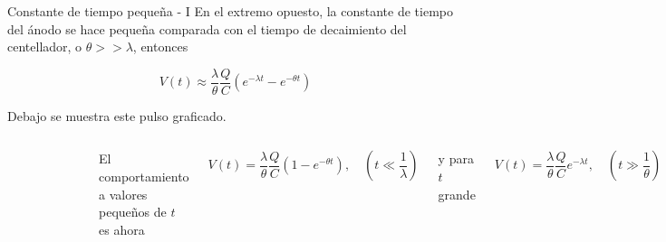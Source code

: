 \documentclass[a4paper,10pt]{beamer}
\begin{document}
\begin{frame}{Constante de tiempo pequeña - I}
En el extremo opuesto, la constante de tiempo del ánodo se hace pequeña comparada 
con el tiempo de decaimiento del centellador, o $\theta >> \lambda$, entonces 

\begin{equation}
 V(t) \approx \frac{\lambda}{\theta}\frac{Q}{C}(e^{-\lambda t} - e^{-\theta t})
\end{equation}

Debajo se muestra este pulso graficado. 

  \begin{columns}[c]
  
 \column{2in}
 
\begin{figure}
  \center
  \includegraphics[scale=0.37]{fig46}
  \end{figure}


 \column{2in}
  El comportamiento a valores pequeños de $t$ es ahora
  
  \begin{equation*}
   V(t) = \frac{\lambda}{\theta}\frac{Q}{C}(1 - e^{-\theta t}), \quad \left(t \ll \frac{1}{\lambda} \right)
  \end{equation*}
  
  y para $t$ grande 
  
  \begin{equation*}
   V(t) = \frac{\lambda}{\theta}\frac{Q}{C}e^{-\lambda t}, \quad \left(t \gg \frac{1}{\theta} \right)
  \end{equation*}
 
 \end{columns}
\end{frame}
\end{document}
